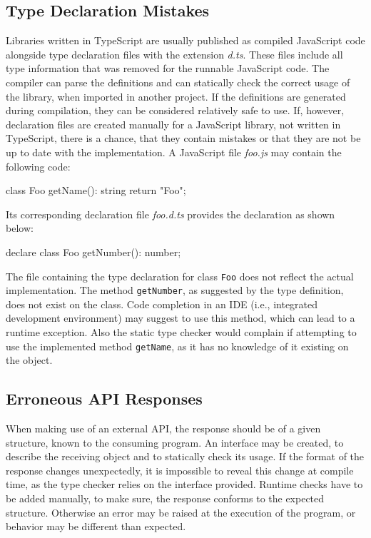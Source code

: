 \subsection{Type Declaration Mistakes}

Libraries written in TypeScript are usually published as compiled JavaScript code alongside type declaration files with the extension \emph{d.ts}. These files include all type information that was removed for the runnable JavaScript code. The compiler can parse the definitions and can statically check the correct usage of the library, when imported in another project. If the definitions are generated during compilation, they can be considered relatively safe to use. If, however, declaration files are created manually for a JavaScript library, not written in TypeScript, there is a chance, that they contain mistakes or that they are not be up to date with the implementation. A JavaScript file \emph{foo.js} may contain the following code:
\begin{JsCode}[numbers=none]
class Foo {
  getName(): string {
    return "Foo";
  }
}
\end{JsCode}
Its corresponding declaration file \emph{foo.d.ts} provides the declaration as shown below:
\begin{JsCode}[numbers=none]
declare class Foo {
  getNumber(): number;
}
\end{JsCode}
The file containing the type declaration for class \texttt{Foo} does not reflect the actual implementation. The method \texttt{getNumber}, as suggested by the type definition, does not exist on the class. Code completion in an IDE (i.e., integrated development environment) may suggest to use this method, which can lead to a runtime exception. Also the static type checker would complain if attempting to use the implemented method \texttt{getName}, as it has no knowledge of it existing on the object.

\subsection{Erroneous API Responses}

When making use of an external API, the response should be of a given structure, known to the consuming program. An interface may be created, to describe the receiving object and to statically check its usage. If the format of the response changes unexpectedly, it is impossible to reveal this change at compile time, as the type checker relies on the interface provided. Runtime checks have to be added manually, to make sure, the response conforms to the expected structure. Otherwise an error may be raised at the execution of the program, or behavior may be different than expected.

